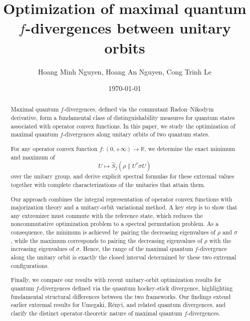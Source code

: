 \documentclass[10pt,reqno]{amsart}
\theoremstyle{break-italic}
\theoremstyle{break-italic}
\theoremstyle{break-italic}
\theoremstyle{break-italic}
\theoremstyle{break-italic}
\theoremstyle{break-italic}
\theoremstyle{break-italic}
\theoremstyle{break-italic}
\theoremstyle{break-roman}
\theoremstyle{standard}
\theoremstyle{varthm-roman}
\theoremstyle{varthm-italic}
\theoremstyle{varthm-roman-break}
\theoremstyle{varthm-italic-break}
\theoremstyle{varthm-roman-no-punctuation}
\theoremstyle{varthm-italic-no-punctuation}
\numberwithin{equation}{section}
\begin{document}
\title[Optimization of maximal quantum $f$-divergences between unitary orbits]{Optimization of maximal quantum
$f$-divergences between unitary orbits}
\author{Hoang Minh Nguyen, Hoang An Nguyen, Cong Trinh Le}

\date{\today}
\begin{abstract}
 Maximal quantum $f$-divergences, defined via the commutant Radon--Nikodym
derivative, form a fundamental class of distinguishability measures for quantum states associated with operator convex functions. In this paper, we study the optimization of maximal quantum $f$-divergences along unitary
orbits of two quantum states.

For any operator convex function $f:(0,+\infty)\to\mathbb{R}$, we determine 
the exact minimum and maximum of
\[
U \longmapsto \widehat S_f(\rho\|U^*\sigma U)
\]
over the unitary group, and derive explicit spectral formulas for these
extremal values together with complete characterizations of the unitaries
that attain them.

Our approach combines the integral representation of operator convex functions with majorization theory and a unitary-orbit variational method. A key step is to show that any extremizer must commute with the reference state, which reduces the noncommutative optimization problem to a spectral permutation problem. As a consequence, the minimum is achieved by pairing the decreasing eigenvalues of $\rho$ and $\sigma$, while the maximum corresponds to pairing the decreasing eigenvalues of $\rho$ with the increasing eigenvalues of $\sigma$. Hence, the range of the maximal quantum $f$-divergence along the unitary orbit is exactly the closed interval determined by these two extremal configurations.

Finally, we compare our results with recent unitary-orbit optimization results for quantum $f$-divergences defined via the quantum hockey-stick divergence, highlighting fundamental structural differences between the two
frameworks. Our findings extend earlier extremal results for Umegaki, R\'enyi, and related quantum divergences, and clarify the distinct operator-theoretic nature of maximal quantum $f$-divergences.
\end{abstract}
\maketitle
\end{document}
